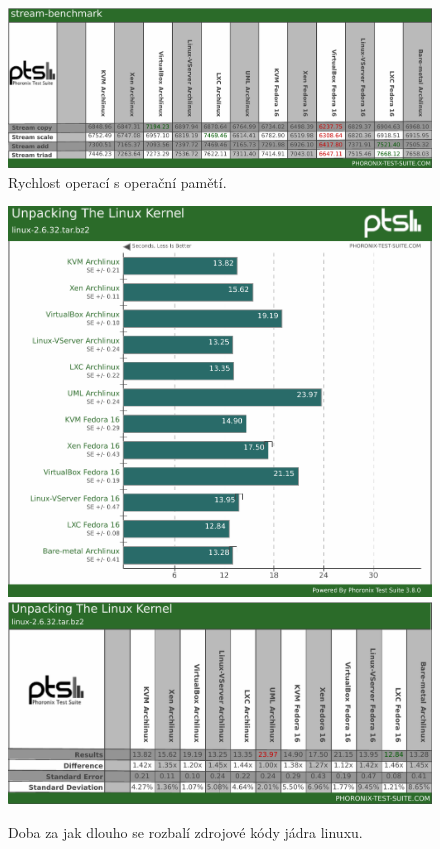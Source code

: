 \begin{figure}[h!]
  \includegraphics[width=152mm]{obr/bench/stream-table}
  \caption{Rychlost operací s operační pamětí.}
  \label{obr:bench:stream}
\end{figure}


\begin{figure}[h!]
  \centering
  \includegraphics[width=15cm]{obr/bench/unpack-linux-graph}
  \includegraphics[width=15cm]{obr/bench/unpack-linux-table}
  \caption{Doba za jak dlouho se rozbalí zdrojové kódy jádra linuxu.}
  \label{obr:bench:unpacklinux}
\end{figure}


